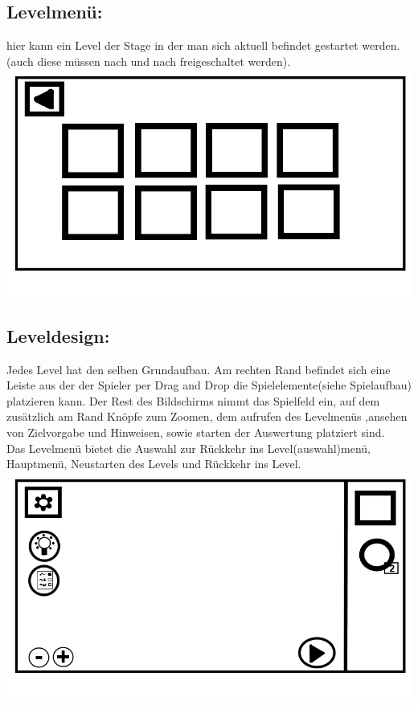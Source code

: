 \documentclass{scrartcl}
\begin{document}
\begin{enumerate}
	\begin{minipage}{1\textwidth}
		\item \subsection*{Levelmenü:}
		hier kann ein Level der Stage in der man sich aktuell befindet gestartet werden.(auch diese müssen nach und nach freigeschaltet werden).\\
		\includegraphics[width=\textwidth, height=7.5cm]{assets/Levelmenu}
	\end{minipage}
	
	\begin{minipage}{1\textwidth}
		\item \subsection*{Leveldesign:} \label{appaufbau:Leveldesign}
		Jedes Level hat den selben Grundaufbau. Am rechten Rand befindet sich eine Leiste aus der der Spieler per Drag and Drop die Spielelemente(siehe Spielaufbau) platzieren kann. Der Rest des Bildschirms nimmt das Spielfeld ein, auf dem zusätzlich am Rand Knöpfe zum Zoomen, dem aufrufen des Levelmenüs ,ansehen von Zielvorgabe und Hinweisen, sowie starten der Auswertung platziert sind.\\
		Das Levelmenü bietet die Auswahl zur Rückkehr ins Level(auswahl)menü, Hauptmenü, Neustarten des Levels und Rückkehr ins Level.\\
		\includegraphics[width=\textwidth, height=7.5cm]{assets/LevelDesign}
	\end{minipage}
	

\end{enumerate}
\end{document}

